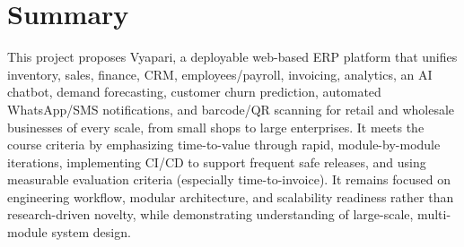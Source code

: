 \documentclass[11pt,a4paper]{article}
\begin{document}
\section{Summary}
This project proposes Vyapari, a deployable web-based ERP platform that unifies inventory, sales, finance, CRM, employees/payroll, invoicing, analytics, an AI chatbot, demand forecasting, customer churn prediction, automated WhatsApp/SMS notifications, and barcode/QR scanning for retail and wholesale businesses of every scale, from small shops to large enterprises. It meets the course criteria by emphasizing time-to-value through rapid, module-by-module iterations, implementing CI/CD to support frequent safe releases, and using measurable evaluation criteria (especially time-to-invoice). It remains focused on engineering workflow, modular architecture, and scalability readiness rather than research-driven novelty, while demonstrating understanding of large-scale, multi-module system design.
\end{document}

